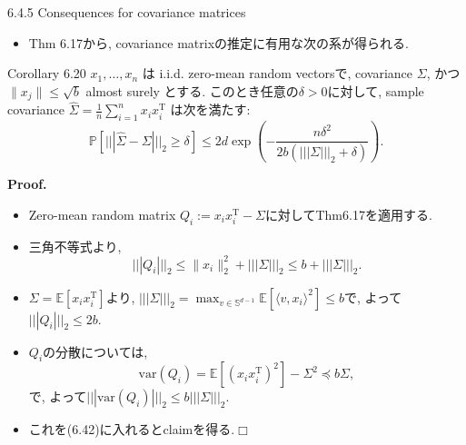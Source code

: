 \documentclass[unicode,aspectratio=169,11pt]{beamer}
\def\qed{\hfill $\Box$}
\newcommand{\ex}{\mathbb{E}}
\newcommand{\var}{\mathrm{var}}
\newcommand{\bb}{\mathbb}
\newcommand{\tr}{\mathrm{T}}
\begin{document}
\begin{frame}{6.4.5 Consequences for covariance matrices}{}
  \begin{itemize}
    \item Thm 6.17から, covariance matrixの推定に有用な次の系が得られる.
  \end{itemize}
  \begin{block}{Corollary 6.20}
    $x_1, \dots, x_n$ は i.i.d. zero-mean random vectorsで, covariance $\Sigma$, かつ $\| x_j \| \le \sqrt{b}$ almost surely とする.
    このとき任意の$\delta > 0$に対して, sample covariance $\widehat{\Sigma} = \frac{1}{n}\sum_{i=1}^n x_i x_i^{\tr}$ は次を満たす:
    \[
      \mathbb{P}\left[|||\widehat{\Sigma} - \Sigma|||_{2} \geq \delta\right]
      \leq 2 d \exp \left(-\frac{n \delta^{2}}{2 b\left(|||\Sigma|||_{2}+\delta\right)}\right).
      \tag{6.49}
    \]
  \end{block}
\end{frame}

\begin{frame}{}{}
  {\bf Proof.}
  \begin{itemize}
    \item Zero-mean random matrix $Q_i := x_i x_i^\tr - \Sigma$に対してThm6.17を適用する.
    \item 三角不等式より,
          \[
            ||| Q_i |||_2 \le \| x_i\|_2^2 + |||\Sigma|||_2 \le b + |||\Sigma|||_2.
          \]
    \item $\Sigma = \ex[x_i x_i^\tr]$より, $||| \Sigma|||_2 = \max_{v \in \bb{S}^{d-1}}\ex[\langle v, x_i\rangle^2] \le b$で, よって$|||Q_i|||_2 \le 2b$.
    \item $Q_i$の分散については,
          \[
            \var(Q_i)
            = \ex[(x_ix_i^\tr)^2] - \Sigma^2
            \preceq b\Sigma,
          \]
          で, よって$||| \var(Q_i)|||_2 \le b|||\Sigma|||_2$.
    \item これを(6.42)に入れるとclaimを得る.\qed
  \end{itemize}
\end{frame}
\end{document}
